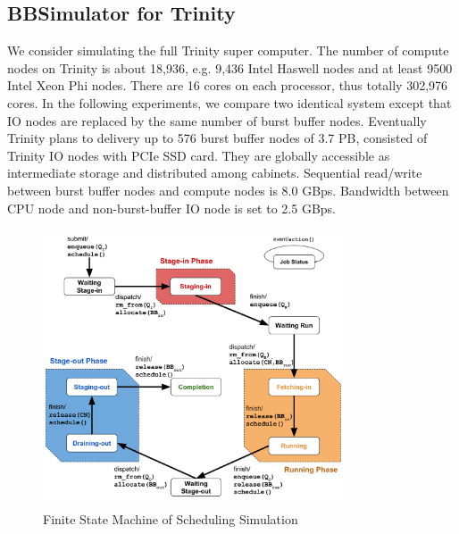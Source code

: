 \subsection{BBSimulator for Trinity}
We consider simulating the full Trinity super computer\cite{TrinitySystem}.
The number of compute nodes on Trinity is about 18,936,
e.g. 9,436 Intel Haswell nodes
and at least 9500 Intel Xeon Phi nodes.
There are 16 cores on each processor, thus totally 302,976 cores.
In the following experiments, we compare two identical system except that
IO nodes are replaced by the same number of burst buffer nodes.
Eventually Trinity plans to delivery up to 576 burst buffer nodes of 3.7 PB,
consisted of Trinity IO nodes with PCIe SSD card.
They are globally accessible as intermediate storage and distributed among cabinets.
Sequential read/write between burst buffer nodes and compute nodes is 8.0 GBps.
Bandwidth between CPU node and non-burst-buffer IO node is set to 2.5 GBps.

\begin{figure}[!t]
        \centering
        \includegraphics[width=3.5in]{3PhaseJobFSM}
        \caption{Finite State Machine of Scheduling Simulation}
        \label{Fig:JobFSM}
\end{figure}


